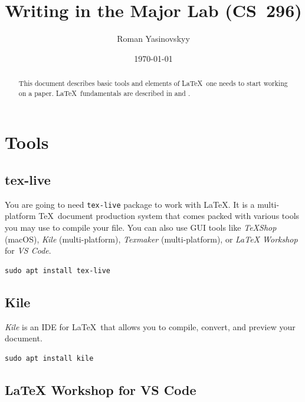 \documentclass[nonacm]{acmart}
\title{Writing in the Major Lab (CS\ 296)}
\author{Roman Yasinovskyy}
\affiliation{
	\institution{Luther College}
	\streetaddress{700 College Dr}
	\city{Decorah}
	\state{Iowa}
	\country{United States}
	\postcode{52101}
}
\date{\today}
\begin{document}
\begin{abstract}

    This document describes basic tools and elements of \LaTeX\ one needs to start working on a paper. \LaTeX\ fundamentals are described in \cite{OverleafTutorial} and \cite{oetiker1995not}.

\end{abstract}

\maketitle

\tableofcontents

\section{Tools}

\subsection{tex-live}

You are going to need \texttt{tex-live} package to work with \LaTeX. It is a multi-platform \TeX\ document production system\cite{TeXLive} that comes packed with various tools you may use to compile your file. You can also use GUI tools like \emph{TeXShop} (macOS), \emph{Kile} (multi-platform), \emph{Texmaker} (multi-platform), or \emph{LaTeX Workshop} for \emph{VS Code}.

\begin{lstlisting}[caption=Installing tex-live, captionpos=b, frame=trbl]
sudo apt install tex-live
\end{lstlisting}

\subsection{Kile}

\emph{Kile} is an IDE for \LaTeX\ that allows you to compile, convert, and preview your document.

\begin{lstlisting}[caption=Installing Kile, captionpos=b, frame=trbl]
sudo apt install kile
\end{lstlisting}

\subsection{LaTeX Workshop for VS Code}
\end{document}
